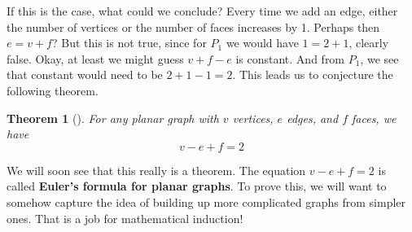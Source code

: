 \documentclass[10pt,]{book}
\newcommand{\terminology}[1]{\textbf{#1}}
\theoremstyle{plain}
\newtheorem{theorem}{Theorem}[section]
\theoremstyle{definition}
\theoremstyle{definition}
\theoremstyle{definition}
\numberwithin{equation}{chapter}
\begin{document}
\par
\hypertarget{p-218}{}%
If this is the case, what could we conclude?  Every time we add an edge, either the number of vertices or the number of faces increases by 1.  Perhaps then \(e = v + f\)?  But this is not true, since for \(P_1\) we would have \(1 = 2 + 1\), clearly false.  Okay, at least we might guess \(v + f - e\) is constant.  And from \(P_1\), we see that constant would need to be \(2 + 1 - 1 = 2\).  This leads us to conjecture the following theorem.%
\begin{theorem}[{}]\label{thm-eulerformula}
\hypertarget{p-219}{}%
For any planar graph with \(v\) vertices, \(e\) edges, and \(f\) faces, we have%
\begin{equation*}
v - e + f = 2
\end{equation*}
%
\end{theorem}
\hypertarget{p-220}{}%
We will soon see that this really is a theorem.  The equation \(v-e+f = 2\) is called \terminology{Euler's formula for planar graphs}.  To prove this, we will want to somehow capture the idea of building up more complicated graphs from simpler ones.  That is a job for mathematical induction!%
\typeout{************************************************}
\typeout{************************************************}
\end{document}
